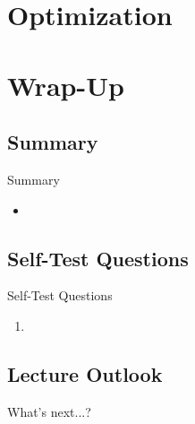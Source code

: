 \section{Optimization}

% 
\begin{frame}{}{}

\end{frame}


\section{Wrap-Up}

\subsection{Summary}

\begin{frame}{Summary}{}
	\begin{itemize}
		\item
	\end{itemize}
\end{frame}


\subsection{Self-Test Questions}

\begin{frame}{Self-Test Questions}{}\important
	\begin{enumerate}
		\item 
	\end{enumerate}
\end{frame}


\subsection{Lecture Outlook}

\begin{frame}{What's next...?}{}
\end{frame}


